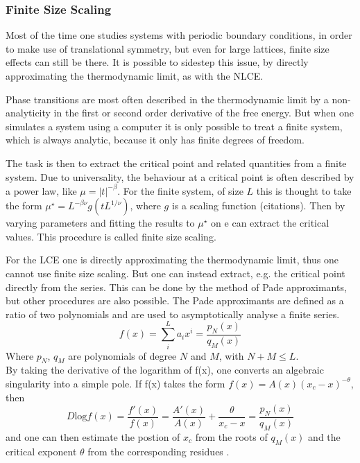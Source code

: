 \documentclass{article}
\begin{document}
\subsubsection{Finite Size Scaling}
Most of the time one studies systems with periodic boundary conditions, in
order to make use of translational symmetry, but even for large lattices,
finite size effects can still be there. It is possible to sidestep
this issue, by directly approximating the
thermodynamic limit, as with the NLCE.

Phase transitions are most often described in the thermodynamic limit by a non-analyticity in the
first or second order derivative of the free energy. But when one
simulates a system using a computer it is only possible to treat a
finite system, which is always analytic, because it only has finite degrees of
freedom. 

The task is then to extract the critical point and related quantities
from a finite system. Due to universality, the behaviour at a critical
point is often described by a power law, like $\mu = |t|^{-\beta}$. For the
finite system, of size $L$ this is thought to take the form
$\mu^{\star} = L^{-\beta
\nu} g(tL^{1/\nu})$, where $g$ is a scaling function (citations). Then
by varying parameters and fitting the results to $\mu^{\star}$ on e
can extract the critical values. This procedure is called finite size
scaling.

For the LCE one is directly approximating the thermodynamic limit,
thus one cannot use finite size scaling. But one can instead extract, e.g.
the critical point directly from the series. This can be done by the
method of Pade approximants, but other procedures are also possible.
The Pade approximants are defined as a ratio of two polynomials and
are used to asymptotically analyse a finite series.
\begin{equation}
\label{eq:34}
f(x) = \sum\limits_i^L a_i x^i = \frac{p_N(x)}{q_M(x)}
\end{equation}
Where $p_N$, $q_M$ are polynomials of degree $N$ and $M$, with $N + M
\leq L$.\\
By taking the derivative of the logarithm of f(x), one converts an
algebraic singularity into a simple pole. If f(x) takes the form $f(x)
= A(x)(x_c -x)^{-\theta}$, then
\begin{equation}
\label{eq:31}
D\text{log}f(x) = \frac{f'(x)}{f(x)} = \frac{A'(x)}{A(x)} +
\frac{\theta}{x_c - x} = \frac{p_N(x)}{q_M(x)}
\end{equation}
and one can then estimate the postion of $x_c$ from the roots of
$q_M(x)$ and the critical exponent $\theta$ from the corresponding
residues \cite{Series}.
\end{document}
